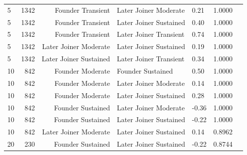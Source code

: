 \begin{table}[H]
\begin{tabular}{l r r l l r r}
5 & 1342 & Founder Transient & Later Joiner Moderate & 0.21 & 1.0000 \\ 
5 & 1342 & Founder Transient & Later Joiner Sustained & 0.40 & 1.0000 \\ 
5 & 1342 & Founder Transient & Later Joiner Transient & 0.74 & 1.0000 \\ 
5 & 1342 & Later Joiner Moderate & Later Joiner Sustained & 0.19 & 1.0000 \\ 
5 & 1342 & Later Joiner Sustained & Later Joiner Transient & 0.34 & 1.0000 \\ 
10 & 842 & Founder Moderate & Founder Sustained & 0.50 & 1.0000 \\ 
10 & 842 & Founder Moderate & Later Joiner Moderate & 0.14 & 1.0000 \\ 
10 & 842 & Founder Moderate & Later Joiner Sustained & 0.28 & 1.0000 \\ 
10 & 842 & Founder Sustained & Later Joiner Moderate & -0.36 & 1.0000 \\ 
10 & 842 & Founder Sustained & Later Joiner Sustained & -0.22 & 1.0000 \\ 
10 & 842 & Later Joiner Moderate & Later Joiner Sustained & 0.14 & 0.8962 \\ 
20 & 230 & Founder Sustained & Later Joiner Sustained & -0.22 & 0.8744 \\ 
\bottomrule
\end{tabular}%
\label{tab:codebase_graph_latex_repository_graph_component_time_series_holm_bonferroni_no_sig_five_and_tenpackages} 
\end{table}
\newpage 
